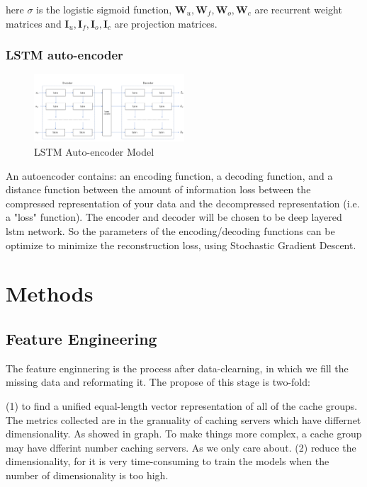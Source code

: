 \documentclass[5p]{elsarticle}
\begin{document}
here $\sigma$ is the logistic sigmoid function, $\mathbf W_u, \mathbf W_f, \mathbf W_o, \mathbf W_c$ are recurrent weight matrices and $\mathbf I_u, \mathbf I_f, \mathbf I_o, \mathbf I_c$ are projection matrices.


\subsubsection{LSTM auto-encoder}
\cite{ChoLearningTranslation}
\begin{figure}[h]
    \centering
    \includegraphics[width=0.5\textwidth]{auto_encoder.png}
    \caption{LSTM Auto-encoder Model}
    \label{fig:RNN_encoder-decoder}
\end{figure}

An autoencoder contains: an encoding function, a decoding function, and a distance function between the amount of information loss between the compressed representation of your data and the decompressed representation (i.e. a "loss" function). The encoder and decoder will be chosen to be deep layered lstm network. So the parameters of the encoding/decoding functions can be optimize to minimize the reconstruction loss, using Stochastic Gradient Descent.  


\section{Methods}
\subsection{Feature Engineering}
The feature enginnering is the process after data-clearning, in which we fill the missing data and reformating it. The propose of this stage is two-fold:

(1) to find a unified equal-length vector representation of all of the cache groups. 
The metrics collected are in the granuality of caching servers which have differnet dimensionality. As showed in graph. To make things more complex, a cache group may have dfferint number caching servers. As we only care about. 
(2) reduce the dimensionality, for it is very time-consuming to train the models when the number of dimensionality is too high.
\end{document}
